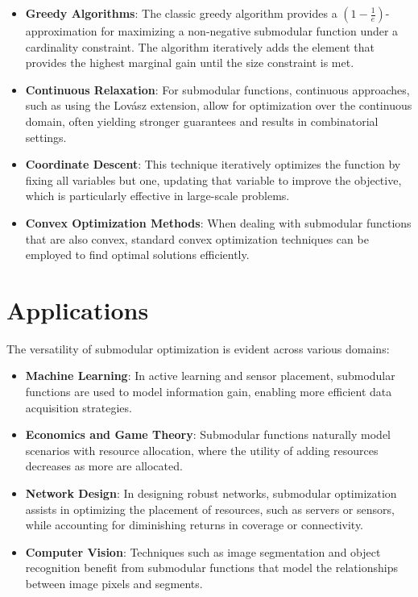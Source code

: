 \begin{itemize}
	\item \textbf{Greedy Algorithms}: The classic greedy algorithm provides a \( (1 - \frac{1}{e}) \)-approximation for maximizing a non-negative submodular function under a cardinality constraint. The algorithm iteratively adds the element that provides the highest marginal gain until the size constraint is met.
	
	\item \textbf{Continuous Relaxation}: For submodular functions, continuous approaches, such as using the Lovász extension, allow for optimization over the continuous domain, often yielding stronger guarantees and results in combinatorial settings.
	
	\item \textbf{Coordinate Descent}: This technique iteratively optimizes the function by fixing all variables but one, updating that variable to improve the objective, which is particularly effective in large-scale problems.
	
	\item \textbf{Convex Optimization Methods}: When dealing with submodular functions that are also convex, standard convex optimization techniques can be employed to find optimal solutions efficiently.
\end{itemize}

\section{Applications}
The versatility of submodular optimization is evident across various domains:

\begin{itemize}
	\item \textbf{Machine Learning}: In active learning and sensor placement, submodular functions are used to model information gain, enabling more efficient data acquisition strategies.
	
	\item \textbf{Economics and Game Theory}: Submodular functions naturally model scenarios with resource allocation, where the utility of adding resources decreases as more are allocated.
	
	\item \textbf{Network Design}: In designing robust networks, submodular optimization assists in optimizing the placement of resources, such as servers or sensors, while accounting for diminishing returns in coverage or connectivity.
	
	\item \textbf{Computer Vision}: Techniques such as image segmentation and object recognition benefit from submodular functions that model the relationships between image pixels and segments.
\end{itemize}

